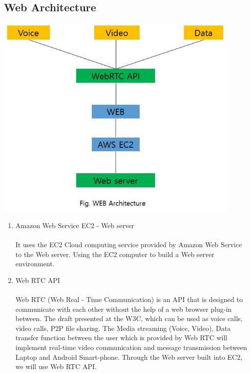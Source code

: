 \documentclass[12pt]{article}
\begin{document}
\subsection*{Web Architecture}
\begin{center} 
\includegraphics[width=120mm,scale=1.8]{webarchitecture}
\end{center}
\begin{enumerate}
\item Amazon Web Service EC2 - Web server\\
\\
It uses the EC2 Cloud computing service provided by Amazon Web Service to the Web server. Using the EC2 computer to build a Web server environment.\\
\item Web RTC API\\
\\
Web RTC (Web Real - Time Communication) is an API that is designed to communicate with each other without the help of a web browser plug-in between. The draft presented at the W3C, which can be used as voice calls, video calls, P2P file sharing. The Media streaming (Voice, Video), Data transfer function between the user which is provided by Web RTC will implement real-time video communication and message transmission between Laptop and Android Smart-phone. Through the Web server built into EC2, we will use Web RTC API.
\\
\end{enumerate}
\end{document}
